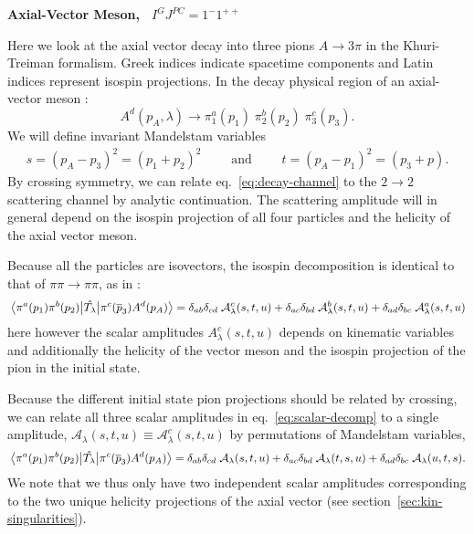 \documentclass[10pt, aps,prd,amsmath,amssymb,superscriptaddress,onecolumn,
nofootinbib,showpacs,preprintnumbers]{revtex4-1}
\begin{document}
\begin{center}
\large \textbf{Axial-Vector Meson, \, \(I^G J^{PC} = 1^-1^{++}\)}
\end{center}

Here we look at the axial vector decay into three pions \(A \to 3\pi\) in the Khuri-Treiman formalism. Greek indices indicate spacetime components and Latin indices represent isospin projections.
In the decay physical region of an axial-vector meson :
  \begin{equation}
    \label{eq:decay-channel}
    A^d(p_A, \lambda) \rightarrow \pi_1^a(p_1)\;  \pi_2^b(p_2) \; \pi^c_3(p_3).
  \end{equation}
We will define invariant Mandelstam variables
  \begin{align}
    s = (p_A - p_3)^2 = (p_1 + p_2)^2 \qquad \text{ and } \qquad t = (p_A - p_1)^2 = (p_3 + p).
  \end{align}
By crossing symmetry, we can relate eq.~\ref{eq:decay-channel} to the \(2\to2\) scattering channel by analytic continuation. The scattering amplitude will in general depend on the isospin projection of all four particles and the helicity of the axial vector meson.

Because all the particles are isovectors, the isospin decomposition is identical to that of \(\pi\pi\to\pi\pi\), as in \cite{Albaladejo2018}:
  \begin{equation}
    \mel{\pi^a(p_1)\pi^b(p_2)}{\hat{T_\lambda}}{\pi^c(\overline{p}_3)A^d(p_A)} = \delta_{ab}\delta_{cd} \; \mathcal{A}^c_\lambda(s,t,u) + \delta_{ac}\delta_{bd} \; \mathcal{A}^b_\lambda(s,t,u) + \delta_{ad}\delta_{bc} \; \mathcal{A}^a_\lambda(s,t,u)
  \end{equation}
here however the scalar amplitudes \(A^c_\lambda(s,t,u)\) depends on kinematic variables and additionally the helicity of the vector meson and the isospin projection of the pion in the initial state.

Because the different initial state pion projections should be related by crossing, we can relate all three scalar amplitudes in eq.~\ref{eq:scalar-decomp} to a single amplitude, \(\mathcal{A}_\lambda(s,t,u) \equiv \mathcal{A}_\lambda^c(s,t,u)\) by permutations of Mandelstam variables,
\begin{equation}
  \label{eq:scalar-decomp}
  \mel{\pi^a(p_1)\pi^b(p_2)}{\hat{T_\lambda}}{\pi^c(\overline{p}_3)A^d(p_A)} = \delta_{ab}\delta_{cd} \; \mathcal{A}_\lambda(s,t,u) + \delta_{ac}\delta_{bd} \; \mathcal{A}_\lambda(t,s,u) + \delta_{ad}\delta_{bc} \; \mathcal{A}_\lambda(u,t,s).
\end{equation}
We note that we thus only have two independent scalar amplitudes corresponding to the two unique helicity projections of the axial vector (see section~\ref{sec:kin-singularities}).
\end{document}
